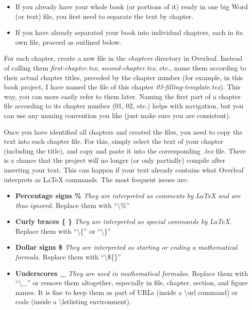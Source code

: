 \begin{itemize}

\item If you already have your whole book (or portions of it) ready in one big Word (or text) file, you first need to separate the text by chapter.

\item If you have already separated your book into individual chapters, each in its own file, proceed as outlined below.

\end{itemize}

For each chapter, create a new file in the \textit{chapters} directory in Overleaf. Instead of calling them \textit{first-chapter.tex}, \textit{second-chapter.tex}, etc., name them according to their actual chapter titles, preceded by the chapter number (for example, in this book project, I have named the file of this chapter \textit{03-filling-template.tex}). This way, you can more easily refer to them later. Naming the first part of a chapter file according to its chapter number (01, 02, etc.) helps with navigation, but you can use any naming convention you like (just make sure you are consistent).

Once you have identified all chapters and created the files, you need to copy the text into each chapter file. For this, simply select the text of your chapter (including the title), and copy and paste it into the corresponding \textit{.tex} file. There is a chance that the project will no longer (or only partially) compile after inserting your text. This can happen if your text already contains what Overleaf interprets as LaTeX commands. The most frequent issues are:

\begin{itemize}
\item \textbf{Percentage signs \%}\index{\%}  \textit{They are interpreted as comments by LaTeX and are thus ignored.} Replace them with ``\textbackslash\%''
\item \textbf{Curly braces \{ \}}\index{\{\}}  \textit{They are interpreted as special commands by LaTeX.} Replace them with ``\textbackslash\{'' or ``\textbackslash\}''
\item \textbf{Dollar signs \$}\index{\$}  \textit{They are interpreted as starting or ending a mathematical formula.} Replace them with ``\textbackslash\$\{\}''
\item \textbf{Underscores \_}\index{\_}  \textit{They are used in mathematical formulas.} Replace them with ``\textbackslash\_'' or remove them altogether, especially in file, chapter, section, and figure names. It is fine to keep them as part of URLs (inside a \textbackslash url command) or code (inside a \textbackslash lstlisting environment).
\end{itemize}

